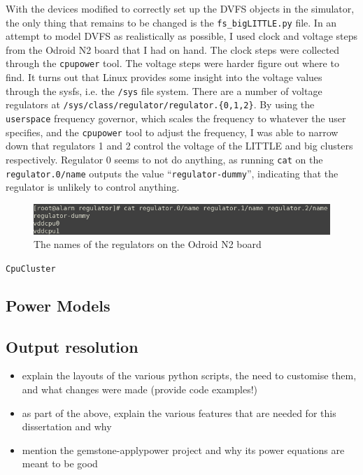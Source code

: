     With the devices modified to correctly set up the DVFS objects in the 
    simulator, the only thing that remains to be changed is the 
    \texttt{fs\_bigLITTLE.py} file. In an attempt to model DVFS as realistically
    as possible, I used clock and voltage steps from the Odroid N2 board that I 
    had on hand. The clock steps were collected through the \texttt{cpupower} 
    tool. The voltage steps were harder figure out where to find. It turns out 
    that Linux provides some insight into the voltage values through the sysfs, 
    i.e. the \texttt{/sys} file system. There are a number of voltage 
    regulators at \texttt{/sys/class/regulator/regulator.\{0,1,2\}}. By using 
    the \texttt{userspace} frequency governor, which scales the frequency to 
    whatever the user specifies, and the \texttt{cpupower} tool to adjust the 
    frequency, I was able to narrow down that regulators 1 and 2 control the 
    voltage of the LITTLE and big clusters respectively. Regulator 0 seems to 
    not do anything, as running \texttt{cat} on the \texttt{regulator.0/name} 
    outputs the value ``\texttt{regulator-dummy}'', indicating that the 
    regulator is unlikely to control anything.
    \begin{figure}[H]
        \centering
        \includegraphics[width=0.9\linewidth]{../screenshots/odroid-stuff/regulator-names.png}
        \caption{The names of the regulators on the Odroid N2 board}
    \end{figure}

    \texttt{CpuCluster}    
    
    \subsection{Power Models}
    
    \subsection{Output resolution}



\begin{itemize}
    \item explain the layouts of the various python scripts, the need to
          customise them, and what changes were made (provide code examples!)
    \item as part of the above, explain the various features that are needed for
          this dissertation and why
    \item mention the gemstone-applypower project and why its power equations
          are meant to be good
\end{itemize}
